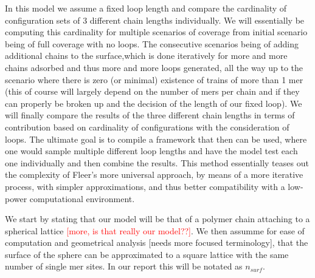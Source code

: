 \documentclass[10pt,letterpaper]{article}
\begin{document}
In this model we assume a fixed loop length and compare the cardinality of configuration sets of 3 different chain lengths individually. We will essentially be computing this cardinality for multiple scenarios of coverage from initial scenario being of full coverage with no loops. The consecutive scenarios being of adding additional chains to the surface,which is done iteratively for more and more chains adsorbed and thus more and more loops generated, all the way up to the scenario where there is zero (or minimal) existence of trains of more than 1 mer (this of course will largely depend on the number of mers per chain and if they can properly be broken up and the decision of the length of our fixed loop). We will finally compare the results of the three different chain lengths in terms of contribution based on cardinality of configurations with the consideration of loops. The ultimate goal is to compile a framework that then can be used, where one would sample multiple different loop lengths and have the model test each one individually and then combine the results. This method essentially teases out the complexity of Fleer's more universal approach, by means of a more iterative process, with simpler approximations, and thus better compatibility with a low-power computational environment.

We start by stating that our model will be that of a polymer chain attaching to a spherical lattice \textcolor{red}{[more, is that really our model??]}. We then assumme for ease of computation and geometrical analysis [needs more focused terminology], that the surface of the sphere can be approximated to a square lattice with the same number of single mer sites. In our report this will be notated as $n_{surf}$. 
\end{document}
